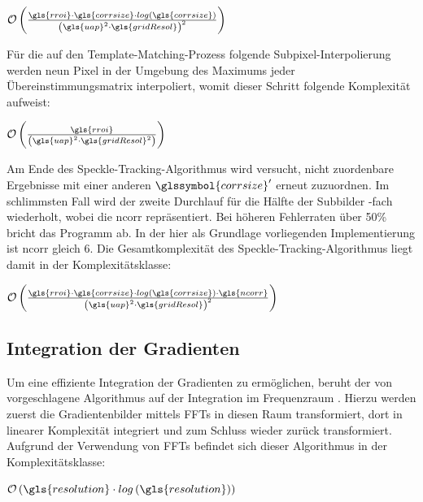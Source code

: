 \begin{center}
	$\mathcal{O}\left(\frac{\gls{rroi} \cdot \gls{corrsize} \cdot log\left(\gls{corrsize}\right)}{\left(\gls{uap}^2 \cdot \gls{gridResol}\right)^2}\right)$
\end{center}

Für die auf den Template-Matching-Prozess folgende Subpixel-Interpolierung werden neun Pixel in der Umgebung des Maximums jeder Übereinstimmungsmatrix interpoliert, womit dieser Schritt folgende Komplexität aufweist:

\begin{center}
	$\mathcal{O}\left(\frac{\gls{rroi}}{\left(\gls{uap}^2 \cdot \gls{gridResol}^2\right)}\right)$
\end{center}

Am Ende des Speckle-Tracking-Algorithmus wird versucht, nicht zuordenbare Ergebnisse mit einer anderen  $\glssymbol{corrsize}'$ erneut zuzuordnen. Im schlimmsten Fall wird der zweite Durchlauf für die Hälfte der Subbilder -fach wiederholt, wobei  die \gls{ncorr} repräsentiert. Bei höheren Fehlerraten über 50\% bricht das Programm ab. In der hier als Grundlage vorliegenden Implementierung ist \gls{ncorr} gleich 6. Die Gesamtkomplexität des Speckle-Tracking-Algorithmus liegt damit in der Komplexitätsklasse:

\begin{center}
	$\mathcal{O}\left(\frac{\gls{rroi} \cdot \gls{corrsize} \cdot log\left(\gls{corrsize}\right) \cdot \gls{ncorr}}{\left(\gls{uap}^2 \cdot \gls{gridResol}\right)^2}\right)$
\end{center}

\subsection{Integration der Gradienten}

Um eine effiziente Integration der Gradienten zu ermöglichen, beruht der von \citeauthor{FC88} vorgeschlagene Algorithmus auf der Integration im Frequenzraum \cite{FC88}. Hierzu werden zuerst die Gradientenbilder mittels \glspl{FFT} in diesen Raum transformiert, dort in linearer Komplexität integriert und zum Schluss wieder zurück transformiert. Aufgrund der Verwendung von \glspl{FFT} befindet sich dieser Algorithmus in der Komplexitätsklasse:

\begin{center}
	$\mathcal{O}\left(\gls{resolution} \cdot log\left(\gls{resolution}\right)\right)$
\end{center}

